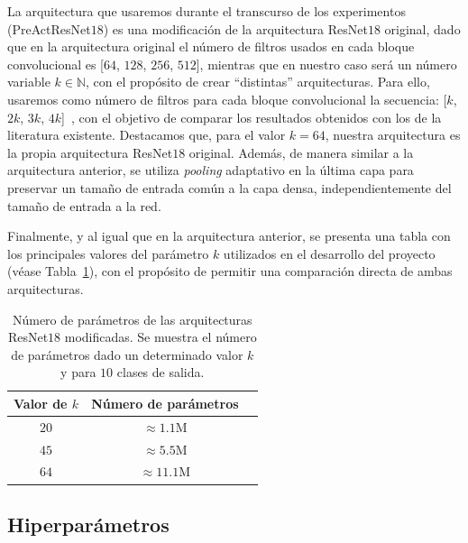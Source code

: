 La arquitectura que usaremos durante el transcurso de los experimentos (PreActResNet$18$) es una modificación de la arquitectura ResNet$18$ original, dado que en la arquitectura original el número de filtros usados en cada bloque convolucional es [$64$, $128$, $256$, $512$], mientras que en nuestro caso será un número variable $k \in \mathbb{N}$, con el propósito de crear ``distintas'' arquitecturas. Para ello, usaremos como número de filtros para cada bloque convolucional la secuencia: [$k$, $2k$, $3k$, $4k$]~\cite{Nakkiran2019}, con el objetivo de comparar los resultados obtenidos con los de la literatura existente. Destacamos que, para el valor $k=64$, nuestra arquitectura es la propia arquitectura ResNet$18$ original. Además, de manera similar a la arquitectura anterior, se utiliza \textit{pooling} adaptativo en la última capa para preservar un tamaño de entrada común a la capa densa, independientemente del tamaño de entrada a la red.

Finalmente, y al igual que en la arquitectura anterior, se presenta una tabla con los principales valores del parámetro $k$ utilizados en el desarrollo del proyecto (véase Tabla~\ref{tab:numero-parametrosresnet}), con el propósito de permitir una comparación directa de ambas arquitecturas.

\begin{table}[ht]
    \centering
    \begin{tabular}{|c|c|c|}
    \hline
    \textbf{Valor de $k$}           & \textbf{Número de parámetros}                     
    \\ \hline
    $20$                  & $\approx 1.1$\space M                                            \\ \hline
    $45$                  & $\approx 5.5$\space M                                             \\ \hline
    $64$                  & $\approx 11.1$\space M                                             \\ \hline
    \end{tabular}
    \caption[Número de parámetros de las arquitecturas ResNet$18$ modificadas.]{Número de parámetros de las arquitecturas ResNet$18$ modificadas. Se muestra el número de parámetros dado un determinado valor $k$ y para $10$ clases de salida.}\label{tab:numero-parametrosresnet}
\end{table}

\subsection{Hiperparámetros}\label{subsec:hiperparametros}

